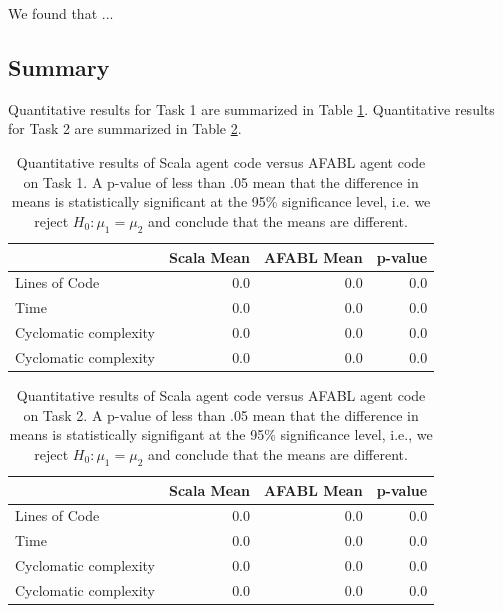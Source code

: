 We found that ...

\subsection{Summary}

Quantitative results for Task 1 are summarized in Table \ref{tbl:task1-results}. Quantitative results for Task 2 are summarized in Table \ref{tbl:task2-results}.

\begin{center}
\begin{table}[h]
\begin{tabular}{|l|r|r|r|}\hline
                      & Scala Mean & AFABL Mean & p-value \\\hline
Lines of Code         & 0.0        & 0.0        & 0.0 \\
Time                  & 0.0        & 0.0        & 0.0 \\
Cyclomatic complexity & 0.0        & 0.0        & 0.0 \\
Cyclomatic complexity & 0.0        & 0.0        & 0.0 \\\hline
\end{tabular}
\caption{Quantitative results of Scala agent code versus AFABL agent code on Task 1. A p-value of less than .05 mean that the difference in means is statistically significant at the 95\% significance level, i.e. we reject $H_0: \mu_1 = \mu_2$ and conclude that the means are different.}
\label{tbl:task1-results}
\end{table}
\end{center}

\begin{center}
\begin{table}[h]
\begin{tabular}{|l|r|r|r|}\hline
                      & Scala Mean & AFABL Mean & p-value \\\hline
Lines of Code         & 0.0        & 0.0        & 0.0 \\
Time                  & 0.0        & 0.0        & 0.0 \\
Cyclomatic complexity & 0.0        & 0.0        & 0.0 \\
Cyclomatic complexity & 0.0        & 0.0        & 0.0 \\\hline
\end{tabular}
\caption{Quantitative results of Scala agent code versus AFABL agent code on Task 2. A p-value of less than .05 mean that the difference in means is statistically signifigant at the 95\% significance level, i.e., we reject $H_0: \mu_1 = \mu_2$ and conclude that the means are different.}
\label{tbl:task2-results}
\end{table}
\end{center}

